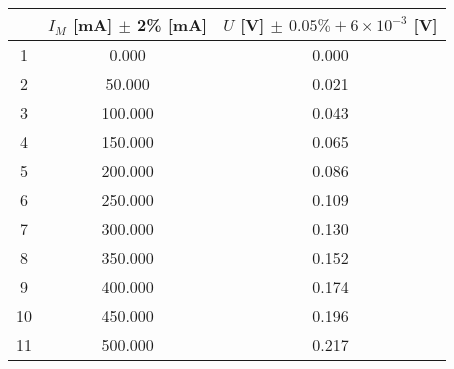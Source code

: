 \begin{tabular}{|c|c|c|}
\hline
& $I_M$ [mA] $\pm$ 2\% [mA] & $U$ [V] $\pm$ $0.05\%+6\times10^{-3}$ [V] \\
\hline
1	&	0.000	&	0.000	\\
\hline
2	&	50.000	&	0.021	\\
\hline
3	&	100.000	&	0.043	\\
\hline
4	&	150.000	&	0.065	\\
\hline
5	&	200.000	&	0.086	\\
\hline
6	&	250.000	&	0.109	\\
\hline
7	&	300.000	&	0.130	\\
\hline
8	&	350.000	&	0.152	\\
\hline
9	&	400.000	&	0.174	\\
\hline
10	&	450.000	&	0.196	\\
\hline
11	&	500.000	&	0.217	\\
\hline
\end{tabular}
